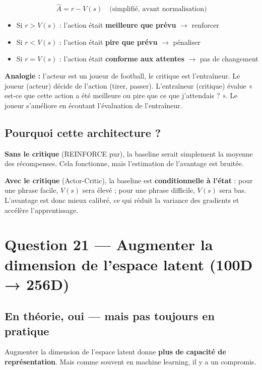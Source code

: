 \documentclass[11pt,a4paper]{article}
\begin{document}
\begin{equation}
\hat{A} = r - V(s) \quad \text{(simplifié, avant normalisation)}
\end{equation}

\begin{itemize}
    \item Si $r > V(s)$ : l'action était \textbf{meilleure que prévu} $\rightarrow$ renforcer
    \item Si $r < V(s)$ : l'action était \textbf{pire que prévu} $\rightarrow$ pénaliser
    \item Si $r = V(s)$ : l'action était \textbf{conforme aux attentes} $\rightarrow$ pas de changement
\end{itemize}

\textbf{Analogie :} l'acteur est un joueur de football, le critique est l'entraîneur. Le joueur (acteur) décide de l'action (tirer, passer). L'entraîneur (critique) évalue « est-ce que cette action a été meilleure ou pire que ce que j'attendais ? ». Le joueur s'améliore en écoutant l'évaluation de l'entraîneur.

\subsection{Pourquoi cette architecture ?}

\textbf{Sans le critique} (REINFORCE pur), la baseline serait simplement la moyenne des récompenses. Cela fonctionne, mais l'estimation de l'avantage est bruitée.

\textbf{Avec le critique} (Actor-Critic), la baseline est \textbf{conditionnelle à l'état} : pour une phrase facile, $V(s)$ sera élevé ; pour une phrase difficile, $V(s)$ sera bas. L'avantage est donc mieux calibré, ce qui réduit la variance des gradients et accélère l'apprentissage.

\section{Question 21 — Augmenter la dimension de l'espace latent (100D → 256D)}

\subsection{En théorie, oui — mais pas toujours en pratique}

Augmenter la dimension de l'espace latent donne \textbf{plus de capacité de représentation}. Mais comme souvent en machine learning, il y a un compromis.
\end{document}
